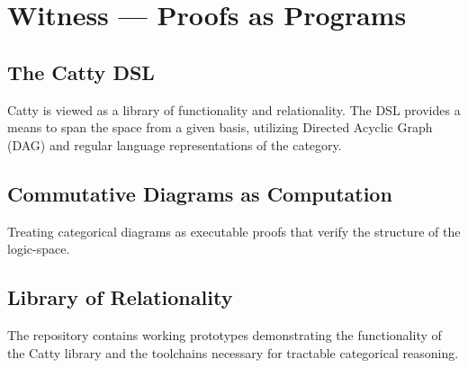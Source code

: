 
\chapter*{Witness --- Proofs as Programs}

\section*{The Catty DSL}
Catty is viewed as a library of functionality and relationality. The DSL provides a means to span the space from a given basis, utilizing Directed Acyclic Graph (DAG) and regular language representations of the category.

\section*{Commutative Diagrams as Computation}
Treating categorical diagrams as executable proofs that verify the structure of the logic-space.

\section*{Library of Relationality}
The repository contains working prototypes demonstrating the functionality of the Catty library and the toolchains necessary for tractable categorical reasoning.

